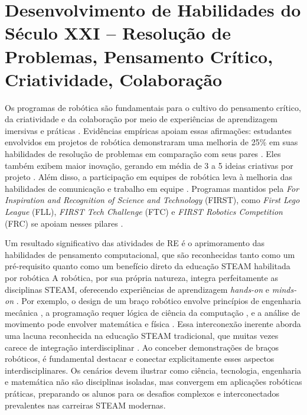 \documentclass[%
  12pt,%
  a4paper,%
  oneside,%
  openright,%
  sumario = abnt-6027-2012,%
  chapter = TITLE,%
  pretextualoneside,%
  fontetimes,%
  semrecuonosumario,%
  usemakeindex,%
  pardeassinaturas,%
  english,%
  french,%
  spanish,%
  brazil,%
]{utfpr}%
\begin{document}
\section{Desenvolvimento de Habilidades do Século XXI -- Resolução de Problemas, Pensamento Crítico, Criatividade, Colaboração}

Os programas de robótica são fundamentais para o cultivo do pensamento crítico, da criatividade e da colaboração por meio de experiências de aprendizagem imersivas e práticas \cite{meegleYouthRobotics2025}. Evidências empíricas apoiam essas afirmações: estudantes envolvidos em projetos de robótica demonstraram uma melhoria de 25\% em suas habilidades de resolução de problemas em comparação com seus pares \cite{acebottImportanceRobotics2025}. Eles também exibem maior inovação, gerando em média de 3 a 5 ideias criativas por projeto \cite{acebottImportanceRobotics2025}. Além disso, a participação em equipes de robótica leva à melhoria das habilidades de comunicação e trabalho em equipe \cite{acebottImportanceRobotics2025}. Programas mantidos pela \textit{For Inspiration and Recognition of Science and Technology} (FIRST), como \textit{First Lego League} (FLL), \textit{FIRST Tech Challenge} (FTC) e \textit{FIRST Robotics Competition} (FRC) se apoiam nesses pilares \cite{firstRobotics2025}.

Um resultado significativo das atividades de RE é o aprimoramento das habilidades de pensamento computacional, que são reconhecidas tanto como um pré-requisito quanto como um benefício direto da educação STEAM habilitada por robótica \cite{rahman2024DigitalK12HRI} A robótica, por sua própria natureza, integra perfeitamente as disciplinas STEAM, oferecendo experiências de aprendizagem \emph{hands-on} e \emph{minds-on} \cite{cheung2024SummerLibraries}. Por exemplo, o design de um braço robótico envolve princípios de engenharia mecânica \cite{acebottImportanceRobotics2025}, a programação requer lógica de ciência da computação \cite{whalesbotRevolutionizingSTEM2025}, e a análise de movimento pode envolver matemática e física \cite{acebottImportanceRobotics2025}. Essa interconexão inerente aborda uma lacuna reconhecida na educação STEAM tradicional, que muitas vezes carece de integração interdisciplinar \cite{lim2024IntegratedSTEMRobotics}. Ao conceber demonstrações de braços robóticos, é fundamental destacar e conectar explicitamente esses aspectos interdisciplinares. Os cenários devem ilustrar como ciência, tecnologia, engenharia e matemática não são disciplinas isoladas, mas convergem em aplicações robóticas práticas, preparando os alunos para os desafios complexos e interconectados prevalentes nas carreiras STEAM modernas.
\end{document}
